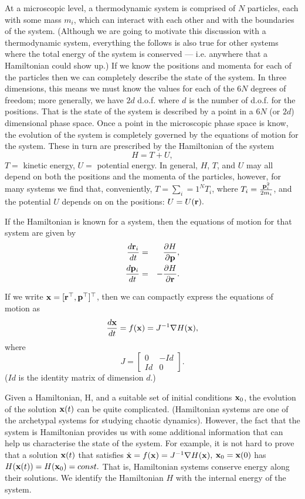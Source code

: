 \documentclass{article}
\begin{document}
At a microscopic level, a thermodynamic system is comprised of $N$ particles, each with some mass $m_i$, which can interact with each other and with the boundaries of the system. (Although we are going to motivate this discussion with a thermodynamic system, everything the follows is also true for other systems where the total energy of the system is conserved --- i.e. anywhere that a Hamiltonian could show up.) If we know the positions and momenta  for each of the particles then we can completely describe the state of the system. In three dimensions, this means we must know the values for each of the $6N$ degrees of freedom; more generally, we have $2d$ d.o.f. where $d$ is the number of d.o.f. for the positions. That is the state of the system is described by a point in a $6N$ (or $2d$) dimensional phase space.
Once a point in the microscopic phase space is know, the evolution of the system is completely governed by the equations of motion for the system. These in turn are prescribed by the Hamiltonian of the system
$$H = T+U,$$
$T=$ kinetic energy, $U=$ potential energy. In general, $H$, $T$, and $U$ may all depend on both the positions and the momenta of the particles, however, for many systems we find that, conveniently, $T = \sum_i=1^N T_i$, where $T_i=\frac{{\bf p}_i^2}{2m_i}$, and the potential $U$ depends on on the positions: $U = U({\bf r}).$

If the Hamiltonian is known for a system, then the equations of motion for that system are given by
\begin{eqnarray*}
	\frac{d{\bf r}_i}{dt} &=& ~~\frac{\partial H}{\partial {\bf p}}, \\
	\frac{d{\bf p}_i}{dt} &=& -\frac{\partial H}{\partial {\bf r}}.
\end{eqnarray*}

If we write ${\bf x} = [{\bf r}^\top,{\bf p}^\top]^\top$, then we can compactly express the equations of motion as
\begin{equation}
	\frac{d{\bf x}}{dt} = f({\bf x}) = J^{-1}\nabla H({\bf x}),
\end{equation}
where
$$
	J = 
	\begin{bmatrix}
		0 & -Id\\
		Id & 0
	\end{bmatrix}.
$$
($Id$ is the identity matrix of dimension $d$.)

Given a Hamiltonian, H, and a suitable set of initial conditions ${\bf x}_0$, the evolution of the solution ${\bf x}(t)$ can be quite complicated. (Hamiltonian systems are one of the archetypal systems for studying chaotic dynamics). However, the fact that the system is Hamiltonian provides us with some additional information that can help us characterise the state of the system. For example, it is not hard to prove that a solution ${\bf x}(t)$ that satisfies $\dot{\bf x} = f({\bf x}) = J^{-1}\nabla H({\bf x}),$ ${\bf x}_0 = {\bf x}(0)$ has $H({\bf x}(t)) = H({\bf x}_0)= const.$ That is, Hamiltonian systems conserve energy along their solutions. We identify the Hamiltonian $H$ with the internal energy of the system.
\end{document}
